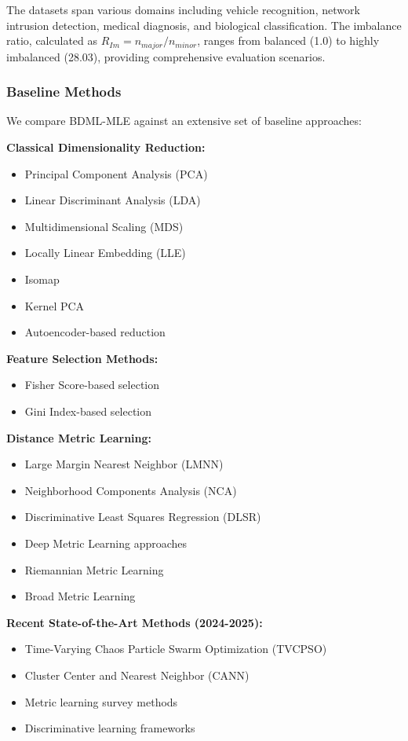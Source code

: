 \documentclass[review]{elsarticle}
\begin{document}
The datasets span various domains including vehicle recognition, network intrusion detection, medical diagnosis, and biological classification. The imbalance ratio, calculated as $R_{Im} = n_{major}/n_{minor}$, ranges from balanced (1.0) to highly imbalanced (28.03), providing comprehensive evaluation scenarios.

\subsubsection{Baseline Methods}

We compare BDML-MLE against an extensive set of baseline approaches:

\textbf{Classical Dimensionality Reduction:}
\begin{itemize}
\item Principal Component Analysis (PCA)
\item Linear Discriminant Analysis (LDA) 
\item Multidimensional Scaling (MDS)
\item Locally Linear Embedding (LLE)
\item Isomap
\item Kernel PCA
\item Autoencoder-based reduction
\end{itemize}

\textbf{Feature Selection Methods:}
\begin{itemize}
\item Fisher Score-based selection
\item Gini Index-based selection
\end{itemize}

\textbf{Distance Metric Learning:}
\begin{itemize}
\item Large Margin Nearest Neighbor (LMNN)~\cite{weinberger2009distance}
\item Neighborhood Components Analysis (NCA)~\cite{goldberger2005neighbourhood}
\item Discriminative Least Squares Regression (DLSR)
\item Deep Metric Learning approaches~\cite{xu2025deep}
\item Riemannian Metric Learning~\cite{gruffaz2025riemannian}
\item Broad Metric Learning~\cite{hu2025broad}
\end{itemize}

\textbf{Recent State-of-the-Art Methods (2024-2025):}
\begin{itemize}
\item Time-Varying Chaos Particle Swarm Optimization (TVCPSO)
\item Cluster Center and Nearest Neighbor (CANN)
\item Metric learning survey methods~\cite{pan2025metric}
\item Discriminative learning frameworks~\cite{duan2025discriminative}
\end{itemize}
\end{document}
